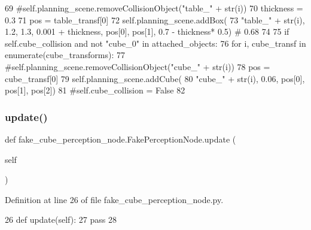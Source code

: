 \begin{DoxyCode}
69                     \textcolor{comment}{#self.planning\_scene.removeCollisionObject("table\_" + str(i))}
70                     thickness = 0.3
71                     pos = table\_transf[0]
72                     self.planning\_scene.addBox(
73                         \textcolor{stringliteral}{"table\_"} + str(i), 1.2, 1.3, 0.001 + thickness, pos[0],  pos[1],  0.7 -  thickness*
      0.5)  \textcolor{comment}{# 0.68}
74 
75             \textcolor{keywordflow}{if} self.cube\_collision \textcolor{keywordflow}{and} \textcolor{keywordflow}{not} \textcolor{stringliteral}{"cube\_0"} \textcolor{keywordflow}{in} attached\_objects:
76                 \textcolor{keywordflow}{for} i, cube\_transf \textcolor{keywordflow}{in} enumerate(cube\_transforms):
77                     \textcolor{comment}{#self.planning\_scene.removeCollisionObject("cube\_" + str(i))}
78                     pos = cube\_transf[0]
79                     self.planning\_scene.addCube(
80                         \textcolor{stringliteral}{"cube\_"} + str(i), 0.06, pos[0],  pos[1],  pos[2])
81                     \textcolor{comment}{#self.cube\_collision = False}
82 
\end{DoxyCode}
\mbox{\label{classfake__cube__perception__node_1_1FakePerceptionNode_ae73741e7f84f057cbf109698e70a2515}} 
\subsubsection{\texorpdfstring{update()}{update()}}
{\footnotesize\ttfamily def fake\+\_\+cube\+\_\+perception\+\_\+node.\+Fake\+Perception\+Node.\+update (\begin{DoxyParamCaption}\item[{}]{self }\end{DoxyParamCaption})}



Definition at line 26 of file fake\+\_\+cube\+\_\+perception\+\_\+node.\+py.


\begin{DoxyCode}
26     \textcolor{keyword}{def }update(self):
27         \textcolor{keywordflow}{pass}
28 
\end{DoxyCode}


